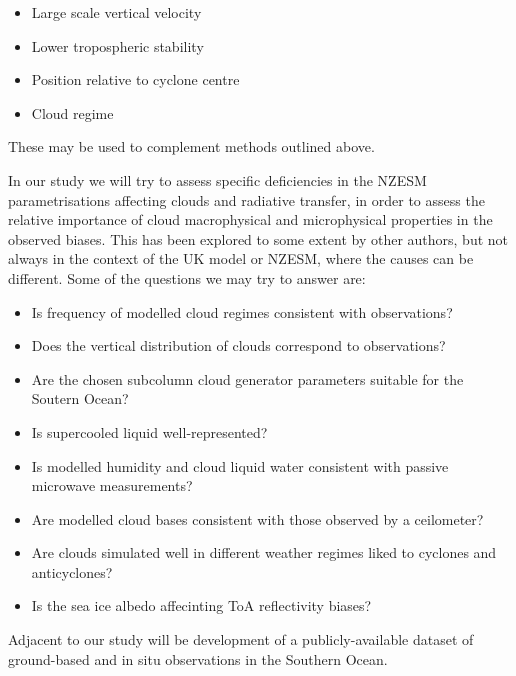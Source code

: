 \begin{itemize}
\itemsep1pt\parskip0pt
\item
  Large scale vertical velocity
\item
  Lower tropospheric stability
\item
  Position relative to cyclone centre
\item
  Cloud regime
\end{itemize}

These may be used to complement methods outlined above.

In our study we will try to assess specific deficiencies in the NZESM
parametrisations affecting clouds and radiative transfer, in order to
assess the relative importance of cloud macrophysical and microphysical
properties in the observed biases. This has been explored to some extent
by other authors, but not always in the context of the UK model or
NZESM, where the causes can be different. Some of the questions we may
try to answer are:

\begin{itemize}
\itemsep1pt\parskip0pt
\item
  Is frequency of modelled cloud regimes consistent with observations?
\item
  Does the vertical distribution of clouds correspond to observations?
\item
  Are the chosen subcolumn cloud generator parameters suitable for the
  Soutern Ocean?
\item
  Is supercooled liquid well-represented?
\item
  Is modelled humidity and cloud liquid water consistent with passive
  microwave measurements?
\item
  Are modelled cloud bases consistent with those observed by a
  ceilometer?
\item
  Are clouds simulated well in different weather regimes liked to
  cyclones and anticyclones?
\item
  Is the sea ice albedo affecinting ToA reflectivity biases?
\end{itemize}

Adjacent to our study will be development of a publicly-available
dataset of ground-based and in situ observations in the Southern Ocean.

